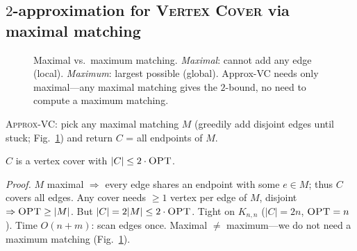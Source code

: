 \subsection{\texorpdfstring{$2$-approximation for \textsc{Vertex Cover}}{2-approximation for Vertex Cover} via maximal matching}
\begin{figure}[h]\centering
{}
\caption{Maximal vs.\ maximum matching. \emph{Maximal}: cannot add any edge (local). \emph{Maximum}: largest possible (global). Approx-VC needs only maximal---any maximal matching gives the $2$-bound, no need to compute a maximum matching.}
\label{fig:maximal-vs-maximum}
\end{figure}
\textsc{Approx-VC}: pick any maximal matching $M$ (greedily add disjoint edges until stuck; Fig.~\ref{fig:maximal-vs-maximum}) and return $C$ = all endpoints of $M$.

\begin{theorem}
$C$ is a vertex cover with $|C|\le 2\cdot\textsc{OPT}$.
\end{theorem}
\emph{Proof.} $M$ maximal $\Rightarrow$ every edge shares an endpoint with some $e\in M$; thus $C$ covers all edges. Any cover needs $\ge1$ vertex per edge of $M$, disjoint $\Rightarrow \textsc{OPT}\ge|M|$. But $|C|=2|M|\le2\cdot\textsc{OPT}$. Tight on $K_{n,n}$ ($|C|=2n$, $\textsc{OPT}=n$). Time $O(n+m)$: scan edges once. Maximal $\neq$ maximum---we do not need a maximum matching (Fig.~\ref{fig:maximal-vs-maximum}).

